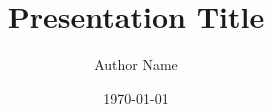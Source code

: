 \documentclass[aspectratio=169]{beamer}
\title[Short Title]{Presentation Title}
\author[Author]{Author Name}
\institute{University of Waterloo}
\date{\today}
\begin{document}
\begin{frame}
  \titlepage
\end{frame}


\end{document}
